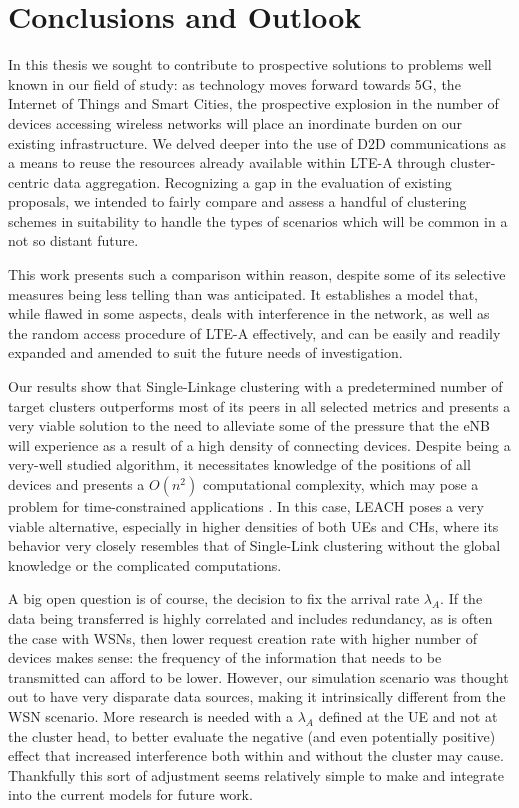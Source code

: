 \chapter{Conclusions and Outlook}

In this thesis we sought to contribute to prospective solutions to problems well known in our field of study: as technology moves forward towards 5G, the Internet of Things and Smart Cities, the prospective explosion in the number of devices accessing wireless networks will place an inordinate burden on our existing infrastructure. We delved deeper into the use of D2D communications as a means to reuse the resources already available within LTE-A through cluster-centric data aggregation. Recognizing a gap in the evaluation of existing proposals, we intended to fairly compare and assess a handful of clustering schemes in suitability to handle the types of scenarios which will be common in a not so distant future.

This work presents such a comparison within reason, despite some of its selective measures being less telling than was anticipated. It establishes a model that, while flawed in some aspects, deals with interference in the network, as well as the random access procedure of LTE-A effectively, and can be easily and readily expanded and amended to suit the future needs of investigation.

Our results show that Single-Linkage clustering with a predetermined number of target clusters outperforms most of its peers in all selected metrics and presents a very viable solution to the need to alleviate some of the pressure that the eNB will experience as a result of a high density of connecting devices. Despite being a very-well studied algorithm, it necessitates knowledge of the positions of all devices and presents a $O(n^2)$ computational complexity, which may pose a problem for time-constrained applications \cite{Everitt2011}. In this case, LEACH poses a very viable alternative, especially in higher densities of both UEs and CHs, where its behavior very closely resembles that of Single-Link clustering without the global knowledge or the complicated computations.

A big open question is of course, the decision to fix the arrival rate $\lambda_A$. If the data being transferred is highly correlated and includes redundancy, as is often the case with WSNs, then lower request creation rate with higher number of devices makes sense: the frequency of the information that needs to be transmitted can afford to be lower. However, our simulation scenario was thought out to have very disparate data sources, making it intrinsically different from the WSN scenario. More research is needed with a $\lambda_A$ defined at the UE and not at the cluster head, to better evaluate the negative (and even potentially positive) effect that increased interference both within and without the cluster may cause. Thankfully this sort of adjustment seems relatively simple to make and integrate into the current models for future work. 

